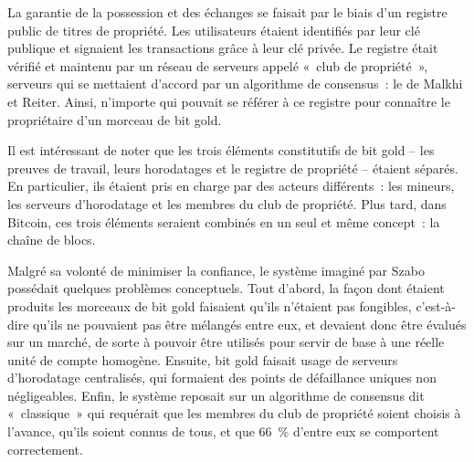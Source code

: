 La garantie de la possession et des échanges se faisait par le biais d'un registre public de titres de propriété. Les utilisateurs étaient identifiés par leur clé publique et signaient les transactions grâce à leur clé privée. Le registre était vérifié et maintenu par un réseau de serveurs appelé «~club de propriété~», serveurs qui se mettaient d'accord par un algorithme de consensus~: le  de Malkhi et Reiter. Ainsi, n'importe qui pouvait se référer à ce registre pour connaître le propriétaire d'un morceau de bit gold.

Il est intéressant de noter que les trois éléments constitutifs de bit gold -- les preuves de travail, leurs horodatages et le registre de propriété -- étaient séparés. En particulier, ils étaient pris en charge par des acteurs différents~: les mineurs, les serveurs d'horodatage et les membres du club de propriété. Plus tard, dans Bitcoin, ces trois éléments seraient combinés en un seul et même concept~: la chaîne de blocs.

Malgré sa volonté de minimiser la confiance, le système imaginé par Szabo possédait quelques problèmes conceptuels. Tout d'abord, la façon dont étaient produits les morceaux de bit gold faisaient qu'ils n'étaient pas fongibles, c'est-à-dire qu'ils ne pouvaient pas être mélangés entre eux, et devaient donc être évalués sur un marché, de sorte à pouvoir être utilisés pour servir de base à une réelle unité de compte homogène. Ensuite, bit gold faisait usage de serveurs d'horodatage centralisés, qui formaient des points de défaillance uniques non négligeables. Enfin, le système reposait sur un algorithme de consensus dit «~classique~» qui requérait que les membres du club de propriété soient choisis à l'avance, qu'ils soient connus de tous, et que 66~\% d'entre eux se comportent correctement.

